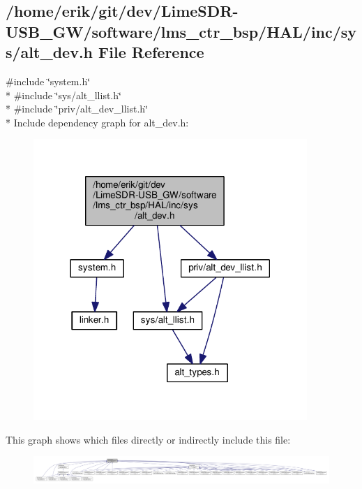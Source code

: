 \subsection{/home/erik/git/dev/\+Lime\+S\+D\+R-\/\+U\+S\+B\+\_\+\+G\+W/software/lms\+\_\+ctr\+\_\+bsp/\+H\+A\+L/inc/sys/alt\+\_\+dev.h File Reference}
\label{alt__dev_8h}
{\ttfamily \#include \char`\"{}system.\+h\char`\"{}}\\*
{\ttfamily \#include \char`\"{}sys/alt\+\_\+llist.\+h\char`\"{}}\\*
{\ttfamily \#include \char`\"{}priv/alt\+\_\+dev\+\_\+llist.\+h\char`\"{}}\\*
Include dependency graph for alt\+\_\+dev.\+h\+:
\nopagebreak
\begin{figure}[H]
\begin{center}
\leavevmode
\includegraphics[width=294pt]{d8/dce/alt__dev_8h__incl}
\end{center}
\end{figure}
This graph shows which files directly or indirectly include this file\+:
\nopagebreak
\begin{figure}[H]
\begin{center}
\leavevmode
\includegraphics[width=350pt]{d0/d89/alt__dev_8h__dep__incl}
\end{center}
\end{figure}
